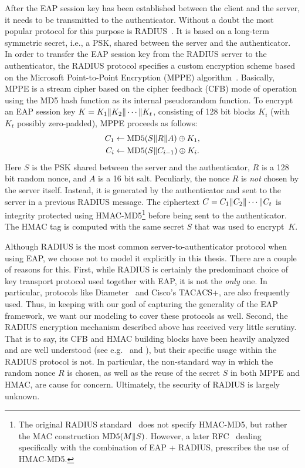 After the EAP session key has been established between the client and the server,
it needs to be transmitted to the authenticator.
Without a doubt the most popular protocol for this purpose is RADIUS~\cite{IETF:RFC2865:RADIUS}.
It is based on a long-term symmetric secret,
i.e., a PSK,
shared between the server and the authenticator.
In order to transfer the EAP session key from the RADIUS server to the authenticator,
the RADIUS protocol specifies a custom encryption scheme based on the Microsoft Point-to-Point Encryption (MPPE) algorithm~\cite{IETF:RFC2548:MS-MPPE-RADIUS-attributes}. 
Basically,
MPPE is a stream cipher based on the cipher feedback (CFB) mode of operation using the MD5 hash function as its internal pseudorandom function.
To encrypt an EAP session key $K = K_1 \| K_2 \| \dotsb \| K_t$,
consisting of 128 bit blocks $K_i$ (with $K_t$ possibly zero-padded),
MPPE proceeds as follows:
\begin{align}\label{eq:EAP:MPPE}
	C_1 &\gets \operatorname{MD5}(S \| R \| A) \oplus K_1 , \\
	C_i &\gets \operatorname{MD5}(S \| C_{i-1}) \oplus K_i .
\end{align} 
Here $S$ is the PSK shared between the server and the authenticator, 
$R$ is a 128 bit random nonce,
and $A$ is a 16 bit salt.
Peculiarly,
the nonce $R$ is \emph{not} chosen by the server itself.
Instead, it is generated by the authenticator and sent to the server in a previous RADIUS message.
The ciphertext $C = C_1 \| C_2 \| \dotsb \| C_t$ is integrity protected using HMAC-MD5\footnote{The original RADIUS standard~\cite{IETF:RFC2865:RADIUS} does not specify HMAC-MD5,
but rather the MAC construction $\operatorname{MD5}(M \| S)$. 
However, a later RFC~\cite{IETF:RFC3579:RADIUS+EAP} dealing specifically with the combination of EAP + RADIUS,
prescribes the use of HMAC-MD5.
} 
before being sent to the authenticator.
The HMAC tag is computed with the same secret $S$ that was used to encrypt~$K$. 


Although RADIUS is the most common server-to-authenticator protocol when using EAP,
we choose not to model it explicitly in this thesis.
There are a couple of reasons for this.
First,
while RADIUS is certainly the predominant choice of key transport protocol used together with EAP,
it is not the \emph{only} one.
In particular,
protocols like Diameter~\cite{IETF:RFC6733:DIAMETER} and Cisco's TACACS+\cite{IETF:DRAFT:TACACS+},
are also frequently used.
Thus,
in keeping with our  goal of capturing the generality of the EAP framework,
we want our modeling to cover these protocols as well.
Second,
the RADIUS encryption mechanism described above has received very little scrutiny. 
That is to say,
its CFB and HMAC building blocks have been heavily analyzed and are well understood
(see e.g.~\cite{EPRINT:Wooding08} and \cite{JC:Bellare15}),
but their specific usage within the RADIUS protocol is not.
In particular,
the non-standard way in which the random nonce $R$ is chosen,
as well as the reuse of the secret $S$ in both MPPE and HMAC,
are cause for concern.
Ultimately,
the security of RADIUS is largely unknown.

